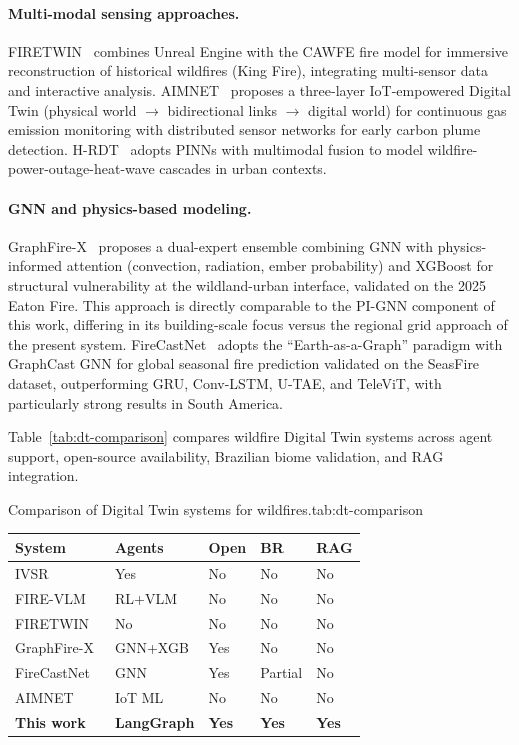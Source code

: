 \documentclass[preprint,12pt,times,numbers]{elsarticle}
\begin{document}
\paragraph{Multi-modal sensing approaches.} FIRETWIN~\cite{article:raha2025} combines Unreal Engine with the CAWFE fire model for immersive reconstruction of historical wildfires (King Fire), integrating multi-sensor data and interactive analysis. AIMNET~\cite{article:aimnet2025} proposes a three-layer IoT-empowered Digital Twin (physical world $\rightarrow$ bidirectional links $\rightarrow$ digital world) for continuous gas emission monitoring with distributed sensor networks for early carbon plume detection. H-RDT~\cite{article:hrdt2025} adopts PINNs with multimodal fusion to model wildfire-power-outage-heat-wave cascades in urban contexts.

\paragraph{GNN and physics-based modeling.} GraphFire-X~\cite{article:esparza2025} proposes a dual-expert ensemble combining GNN with physics-informed attention (convection, radiation, ember probability) and XGBoost for structural vulnerability at the wildland-urban interface, validated on the 2025 Eaton Fire. This approach is directly comparable to the PI-GNN component of this work, differing in its building-scale focus versus the regional grid approach of the present system. FireCastNet~\cite{article:michail2025} adopts the ``Earth-as-a-Graph'' paradigm with GraphCast GNN for global seasonal fire prediction validated on the SeasFire dataset, outperforming GRU, Conv-LSTM, U-TAE, and TeleViT, with particularly strong results in South America.

Table~\ref{tab:dt-comparison} compares wildfire Digital Twin systems across agent support, open-source availability, Brazilian biome validation, and RAG integration.

\begin{resulttable}{Comparison of Digital Twin systems for wildfires.}{tab:dt-comparison}
\begin{tabular}{@{}lp{1.6cm}p{1.2cm}p{1.2cm}p{1.0cm}@{}}
\toprule
\textbf{System} & \textbf{Agents} & \textbf{Open} & \textbf{BR} & \textbf{RAG} \\
\midrule
IVSR~\cite{article:morsali2026} & Yes & No & No & No \\
FIRE-VLM~\cite{article:webb2026} & RL+VLM & No & No & No \\
FIRETWIN~\cite{article:raha2025} & No & No & No & No \\
GraphFire-X~\cite{article:esparza2025} & GNN+XGB & Yes & No & No \\
FireCastNet~\cite{article:michail2025} & GNN & Yes & Partial & No \\
AIMNET~\cite{article:aimnet2025} & IoT ML & No & No & No \\
\textbf{This work} & \textbf{LangGraph} & \textbf{Yes} & \textbf{Yes} & \textbf{Yes} \\
\bottomrule
\end{tabular}
\end{resulttable}
\end{document}
